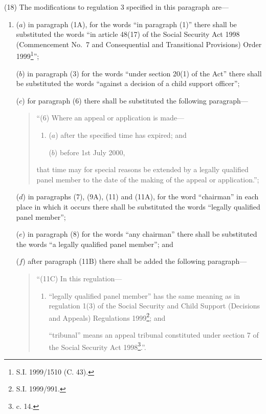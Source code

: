 \documentclass[12pt,a4paper]{article}
\begin{document}
(18) The modifications to regulation 3 specified in this paragraph are—
\begin{enumerate}\item[]
($a$) in paragraph (1A), for the words “in paragraph (1)” there shall be substituted the words “in article 48(17) of the Social Security Act 1998 (Commencement No.\ 7 and Consequential and Transitional Provisions) Order 1999\footnote{\frenchspacing S.I. 1999/1510 (C. 43).}”;

($b$) in paragraph (3) for the words “under section 20(1) of the Act” there shall be substituted the words “against a decision of a child support officer”;

($c$) for paragraph (6) there shall be substituted the following paragraph—
\begin{quotation}
“(6) Where an appeal or application is made—
\begin{enumerate}\item[]
($a$) after the specified time has expired; and

($b$) before 1st July 2000,
\end{enumerate}
that time may for special reasons be extended by a legally qualified panel member to the date of the making of the appeal or application.”;
\end{quotation}

($d$) in paragraphs (7), (9A), (11) and (11A), for the word “chairman” in each place in which it occurs there shall be substituted the words “legally qualified panel member”;

($e$) in paragraph (8) for the words “any chairman” there shall be substituted the words “a legally qualified panel member”; and

($f$) after paragraph (11B) there shall be added the following paragraph—
\begin{quotation}
“(11C) In this regulation—
\begin{enumerate}\item[]
    “legally qualified panel member” has the same meaning as in regulation 1(3) of the Social Security and Child Support (Decisions and Appeals) Regulations 1999\footnote{\frenchspacing S.I. 1999/991.}; and

    “tribunal” means an appeal tribunal constituted under section 7 of the Social Security Act 1998\footnote{ c. 14.}.”.
\end{enumerate} 
\end{quotation}
\end{enumerate}
\end{document}
